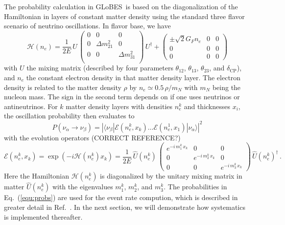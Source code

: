 \documentclass[12pt,a4paper]{article}
\newcommand{\eq}{Eq.}
\newcommand{\Ref}{Ref.}
\newcommand{\ldm}{\Delta m_{31}^2}
\newcommand{\sdm}{\Delta m_{21}^2}
\newcommand{\deltacp}{\delta_{\mathrm{CP}}}
\newcommand{\GLOBES}{{\sf GLoBES}}
\newcommand{\equ}[1]{\eq~(\ref{equ:#1})}
\begin{document}
The probability calculation in \GLOBES\ is based on the diagonalization of the
Hamiltonian in layers of constant matter density using the standard three flavor
scenario of neutrino oscillations. In flavor base, we have
\begin{equation}
\mathcal{H}(n_e) = \frac{1}{2E} \, U \,
\left(
\begin{array}{ccc}
0 & 0 & 0 \\
0  & \sdm & 0 \\
0  & 0 & \ldm \\
\end{array}
\right) \,
U^\dagger + 
\left(
\begin{array}{ccc}
 \pm \sqrt{2} G_F n_e & 0 & 0 \\
0 & 0 & 0 \\
0 & 0 & 0 
\end{array}
\right)
\label{equ:ham}
\end{equation}
with $U$ the mixing matrix (described by four parameters $\theta_{12}$, $\theta_{13}$, $\theta_{23}$, and $\deltacp$), and $n_e$ the constant electron density
in that matter density layer. The electron density is related to the matter density $\rho$ by 
$n_e \simeq 0.5 \, \rho/m_N$ with $m_N$ being the nucleon mass. The sign in the second term depends on if one
uses neutrinos or antineutrinos. For $k$ matter density layers with densities
$n^k_e$ and thicknesses $x_i$, the oscillation probability then evaluates to
\begin{equation}
P(\nu_\alpha \rightarrow \nu_\beta) = \left| \langle \nu_\beta | \mathcal{E}(n^k_e, x_k) \hdots  \mathcal{E}(n^1_e, x_1) | \nu_\alpha \rangle \right|^2
\label{equ:probs}
\end{equation}
with the evolution operators (CORRECT REFERENCE?)
\begin{equation}
  \mathcal{E}(n^k_e, x_k) = \exp \left( -i \mathcal{H}(n^k_e) x_k \right) = \frac{1}{2E} \, \hat{U}(n^k_e) \, \left( \begin{array}{ccc}
e^{-i \, m_1^k \, x_k} & 0 & 0 \\
0 &  e^{-i \, m_2^k \, x_k} & 0 \\
0 & 0 & e^{-i \, m_3^k \, x_k} 
\end{array}
\right) \, \hat{U}(n^k_e)^\dagger \, .
\end{equation}
Here the Hamiltonian $\mathcal{H}(n^k_e)$ is diagonalized by the unitary mixing matrix in matter $\hat{U}(n^k_e)$
with the eigenvalues $m_1^k$, $m_2^k$, and $m_3^k$. The probabilities in \equ{probs} are used for the
event rate compution, which is described in greater detail in \Ref~\cite{Huber:2004ka}. In the next section,
we will demonstrate how systematics is implemented thereafter.
\end{document}
